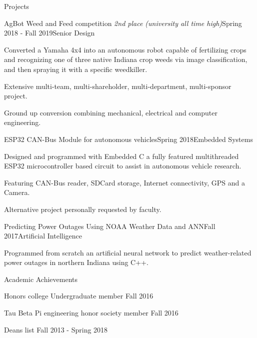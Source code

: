\documentclass{resume}
\begin{document}
\begin{rSection}{Projects}
\begin{rSubsection}{AgBot Weed and Feed competition \emph{2nd place (university all time high)}}{Spring 2018 - Fall 2019}{{Senior Design}}{}
    \item Converted a Yamaha 4x4 into an autonomous robot capable of fertilizing crops and recognizing one of three native Indiana crop weeds via image classification, and then spraying it with a specific weedkiller.
    \item Extensive multi-team, multi-shareholder, multi-department, multi-sponsor project.
    \item Ground up conversion combining mechanical, electrical and computer engineering.
\end{rSubsection}

\begin{rSubsection}{ESP32 CAN-Bus Module for autonomous vehicles}{Spring 2018}{{Embedded Systems}}{}
    \item Designed and programmed with Embedded C a fully featured multithreaded ESP32 microcontroller based circuit to assist in autonomous vehicle research.
    \item Featuring CAN-Bus reader, SDCard storage, Internet connectivity, GPS and a Camera.
    \item Alternative project personally requested by faculty.
\end{rSubsection}


\begin{rSubsection}{Predicting Power Outages Using NOAA Weather Data and ANN}{Fall 2017}{{Artificial Intelligence}}{}
    \item Programmed from scratch an artificial neural network to predict weather-related power outages in northern Indiana using C++.
\end{rSubsection}

\end{rSection}
% 
\begin{rSection}{Academic Achievements} 
    \item Honors college Undergraduate member \hfill Fall 2016
    \item Tau Beta Pi engineering honor society member \hfill Fall 2016
    \item Deans list \hfill Fall 2013 - Spring 2018
\end{rSection}
\end{document}
